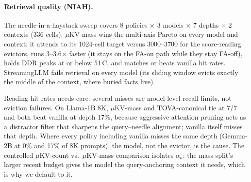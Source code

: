 \documentclass[sigconf, anonymous=false, screen=true]{acmart}
\begin{document}
\paragraph{Retrieval quality (NIAH).}
The needle-in-a-haystack sweep covers 8 policies $\times$ 3 models $\times$ 7 depths $\times$ 2 contexts (336 cells). $\mu$KV-mass wins the multi-axis Pareto on every model and context: it attends to its 1024-cell target versus 3000--3700 for the score-reading evictors, runs 3--3.6$\times$ faster (it stays on the FA-on path while they stay FA-off), holds DDR peaks at or below 51\,\textdegree C, and matches or beats vanilla hit rates. StreamingLLM fails retrieval on every model (its sliding window evicts exactly the middle of the context, where buried facts live).

Reading hit rates needs care: several misses are model-level recall limits, not eviction failures. On Llama-1B 8K, $\mu$KV-mass and TOVA-canonical tie at 7/7 and both beat vanilla at depth 17\%, because aggressive attention pruning acts as a distractor filter that sharpens the query--needle alignment; vanilla itself misses that depth. Where every policy including vanilla misses the same depth (Gemma-2B at 0\% and 17\% of 8K prompts), the model, not the evictor, is the cause. The controlled $\mu$KV-count vs.\ $\mu$KV-mass comparison isolates $\alpha_a$: the mass split's larger recent budget gives the model the query-anchoring context it needs, which is why we default to it.
\end{document}
